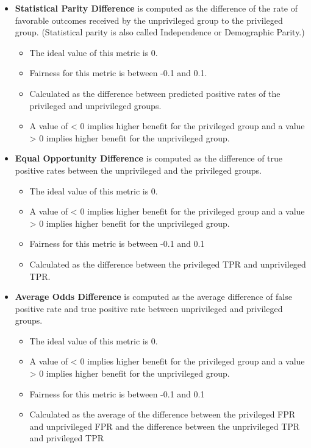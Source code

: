 \documentclass[assignment03_Solutions]{subfiles}
\begin{document}
\begin{itemize}
    \item \textbf{Statistical Parity Difference} is computed as the difference of the rate of favorable outcomes received by the unprivileged group to the privileged group. (Statistical parity is also called Independence or Demographic Parity.)
    \begin{itemize}
        \item The ideal value of this metric is 0.
        \item Fairness for this metric is between -0.1 and 0.1.
        \item Calculated as the difference between predicted positive rates of the privileged and unprivileged groups.
        \item A value of < 0 implies higher benefit for the privileged group and a value > 0 implies higher benefit for the unprivileged group.
    \end{itemize}
    \item \textbf{Equal Opportunity Difference} is computed as the difference of true positive rates between the unprivileged and the privileged groups.
    \begin{itemize}
        \item The ideal value of this metric is 0.
        \item A value of < 0 implies higher benefit for the privileged group and a value > 0 implies higher benefit for the unprivileged group.
        \item Fairness for this metric is between -0.1 and 0.1
        \item Calculated as the difference between the privileged TPR and unprivileged TPR.
    \end{itemize}
    \item \textbf{Average Odds Difference} is computed as the average difference of false positive rate and true positive rate between unprivileged and privileged groups. %
    \begin{itemize}
        \item The ideal value of this metric is 0.
        \item A value of < 0 implies higher benefit for the privileged group and a value > 0 implies higher benefit for the unprivileged group.
        \item Fairness for this metric is between -0.1 and 0.1
        \item Calculated as the average of the difference between the privileged FPR and unprivileged FPR and the difference between the unprivileged TPR and privileged TPR

\end{itemize}
\end{itemize}
\end{document}
